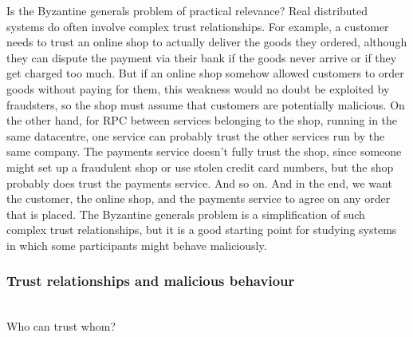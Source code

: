Is the Byzantine generals problem of practical relevance?
Real distributed systems do often involve complex trust relationships.
For example, a customer needs to trust an online shop to actually deliver the goods they ordered, although they can dispute the payment via their bank if the goods never arrive or if they get charged too much.
But if an online shop somehow allowed customers to order goods without paying for them, this weakness would no doubt be exploited by fraudsters, so the shop must assume that customers are potentially malicious.
On the other hand, for RPC between services belonging to the shop, running in the same datacentre, one service can probably trust the other services run by the same company.
The payments service doesn't fully trust the shop, since someone might set up a fraudulent shop or use stolen credit card numbers, but the shop probably does trust the payments service.
And so on.
And in the end, we want the customer, the online shop, and the payments service to agree on any order that is placed.
The Byzantine generals problem is a simplification of such complex trust relationships, but it is a good starting point for studying systems in which some participants might behave maliciously.

\begin{frame}
    \label{s:byzantine-payment}
    \frametitle{Trust relationships and malicious behaviour}
    \begin{center}
        \\[1.5em]
        Who can trust whom?
    \end{center}
\end{frame}
\label{l:byzantine-payment}

